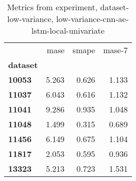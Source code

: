 \begin{table}[h]
\centering
\caption{Metrics from experiment, dataset-low-variance, low-variance-cnn-ae-lstm-local-univariate}
\label{table:low-variance-cnn-ae-lstm-local-univariate-dataset-low-variance}
\begin{tabular}{lrrr}
\toprule
{} &   mase &  smape &  mase-7 \\
\textbf{dataset} &        &        &         \\
\midrule
\textbf{10053  } &  5.263 &  0.626 &   1.133 \\
\textbf{11037  } &  6.043 &  0.616 &   1.132 \\
\textbf{11041  } &  9.286 &  0.935 &   1.048 \\
\textbf{11048  } &  1.499 &  0.315 &   0.689 \\
\textbf{11456  } &  6.149 &  0.675 &   1.104 \\
\textbf{11817  } &  2.053 &  0.595 &   0.936 \\
\textbf{13323  } &  5.213 &  0.723 &   1.531 \\
\bottomrule
\end{tabular}
\end{table}
